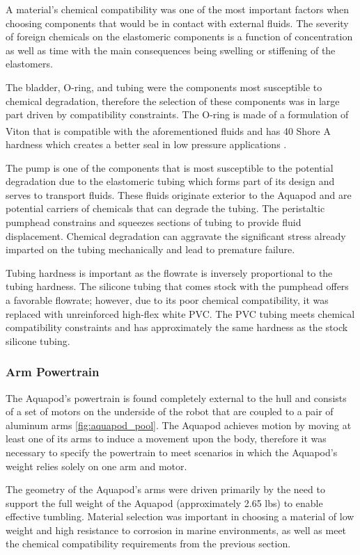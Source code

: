 A material's chemical compatibility was one of the most important factors when choosing components that would be in contact with external fluids. The severity of foreign chemicals on the elastomeric components is a function of concentration as well as time with the main consequences being swelling or stiffening of the elastomers.

The bladder, O-ring, and tubing were the components most susceptible to chemical degradation, therefore the selection of these components was in large part driven by compatibility constraints. The O-ring is made of a formulation of Viton\textsuperscript{\textregistered} that is compatible with the aforementioned fluids and has 40 Shore A hardness which creates a better seal in low pressure applications \cite{Parker-Hannifin2007}.

The pump is one of the components that is most susceptible to the potential degradation due to the elastomeric tubing which forms part of its design and serves to transport fluids. These fluids originate exterior to the Aquapod and are potential carriers of chemicals that can degrade the tubing. The peristaltic pumphead constrains and squeezes sections of tubing to provide fluid displacement. Chemical degradation can aggravate the significant stress already imparted on the tubing mechanically and lead to premature failure.  

Tubing hardness is important as the flowrate is inversely proportional to the tubing hardness. The silicone tubing that comes stock with the pumphead offers a favorable flowrate; however, due to its poor chemical compatibility, it was replaced with unreinforced high-flex white PVC.  The PVC tubing meets chemical compatibility constraints and has approximately the same hardness as the stock silicone tubing. 

\subsubsection{Arm Powertrain}
\label{arm_motors}
The Aquapod's powertrain is found completely external to the hull and consists of a set of motors on the underside of the robot that are coupled to a pair of aluminum arms \ref{fig:aquapod_pool}. The Aquapod achieves motion by moving at least one of its arms to induce a movement upon the body, therefore it was necessary to specify the powertrain to meet scenarios in which the Aquapod's weight relies solely on one arm and motor. 

The geometry of the Aquapod's arms were driven primarily by the need to support the full weight of the Aquapod (approximately 2.65 lbs) to enable effective tumbling. Material selection was important in choosing a material of low weight and high resistance to corrosion in marine environments, as well as meet the chemical compatibility requirements from the previous section. 

